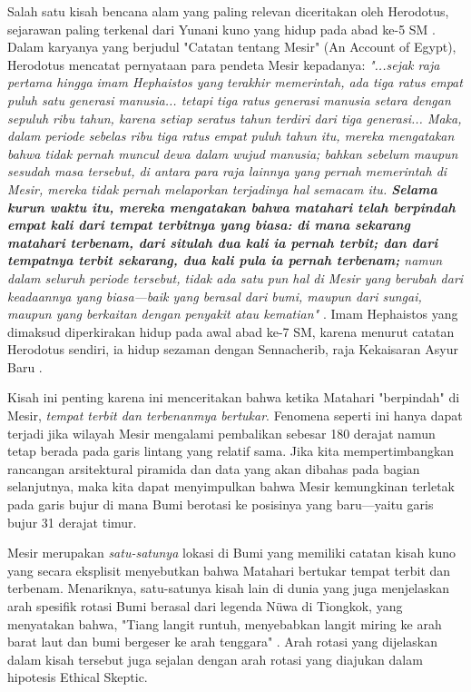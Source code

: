 \documentclass[10pt,twocolumn,letterpaper]{article}
\begin{document}
Salah satu kisah bencana alam yang paling relevan diceritakan oleh Herodotus, sejarawan paling terkenal dari Yunani kuno yang hidup pada abad ke-5 SM \cite{31}. Dalam karyanya yang berjudul "Catatan tentang Mesir" (An Account of Egypt), Herodotus mencatat pernyataan para pendeta Mesir kepadanya: \textit{"...sejak raja pertama hingga imam Hephaistos yang terakhir memerintah, ada tiga ratus empat puluh satu generasi manusia... tetapi tiga ratus generasi manusia setara dengan sepuluh ribu tahun, karena setiap seratus tahun terdiri dari tiga generasi... Maka, dalam periode sebelas ribu tiga ratus empat puluh tahun itu, mereka mengatakan bahwa tidak pernah muncul dewa dalam wujud manusia; bahkan sebelum maupun sesudah masa tersebut, di antara para raja lainnya yang pernah memerintah di Mesir, mereka tidak pernah melaporkan terjadinya hal semacam itu. \textbf{Selama kurun waktu itu, mereka mengatakan bahwa matahari telah berpindah empat kali dari tempat terbitnya yang biasa: di mana sekarang matahari terbenam, dari situlah dua kali ia pernah terbit; dan dari tempatnya terbit sekarang, dua kali pula ia pernah terbenam;} namun dalam seluruh periode tersebut, tidak ada satu pun hal di Mesir yang berubah dari keadaannya yang biasa—baik yang berasal dari bumi, maupun dari sungai, maupun yang berkaitan dengan penyakit atau kematian"} \cite{32}. Imam Hephaistos yang dimaksud diperkirakan hidup pada awal abad ke-7 SM, karena menurut catatan Herodotus sendiri, ia hidup sezaman dengan Sennacherib, raja Kekaisaran Asyur Baru \cite{32,33,34}.

Kisah ini penting karena ini menceritakan bahwa ketika Matahari "berpindah" di Mesir, \textit{tempat terbit dan terbenanmya bertukar}. Fenomena seperti ini hanya dapat terjadi jika wilayah Mesir mengalami pembalikan sebesar 180 derajat namun tetap berada pada garis lintang yang relatif sama. Jika kita mempertimbangkan rancangan arsitektural piramida dan data yang akan dibahas pada bagian selanjutnya, maka kita dapat menyimpulkan bahwa Mesir kemungkinan terletak pada garis bujur di mana Bumi berotasi ke posisinya yang baru—yaitu garis bujur 31 derajat timur.

Mesir merupakan \textit{satu-satunya} lokasi di Bumi yang memiliki catatan kisah kuno yang secara eksplisit menyebutkan bahwa Matahari bertukar tempat terbit dan terbenam. Menariknya, satu-satunya kisah lain di dunia yang juga menjelaskan arah spesifik rotasi Bumi berasal dari legenda Nüwa di Tiongkok, yang menyatakan bahwa, "Tiang langit runtuh, menyebabkan langit miring ke arah barat laut dan bumi bergeser ke arah tenggara" \cite{8}. Arah rotasi yang dijelaskan dalam kisah tersebut juga sejalan dengan arah rotasi yang diajukan dalam hipotesis Ethical Skeptic.
\end{document}
